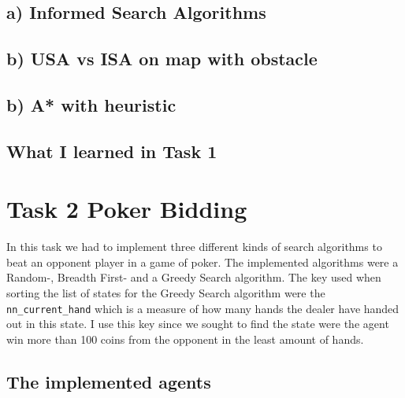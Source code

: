 \documentclass{article}
\begin{document}
\subsection{a) Informed Search Algorithms}

\subsection{b) USA vs ISA on map with obstacle}

\subsection{b) A* with heuristic}

\subsection{What I learned in Task 1}

\newpage
\section{Task 2 Poker Bidding}
In this task we had to implement three different kinds of search algorithms to beat
an opponent player in a game of poker. The implemented algorithms were a Random-, Breadth First-
and a Greedy Search algorithm. The key used when sorting the list of states for the Greedy Search algorithm
were the \texttt{nn\_current\_hand} which is a measure of how many hands the dealer have handed out in this state.
I use this key since we sought to find the state were the agent win more than 100 coins from the opponent in the least
amount of hands.
\subsection{The implemented agents}
\end{document}
